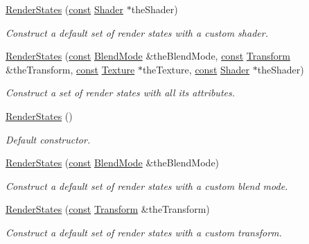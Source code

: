 \begin{DoxyCompactItemize}
\hyperlink{classsf_1_1_render_states_a39f94233f464739d8d8522f3aefe97d0}{Render\-States} (\hyperlink{term__entry_8h_a57bd63ce7f9a353488880e3de6692d5a}{const} \hyperlink{classsf_1_1_shader}{Shader} $\ast$the\-Shader)
\begin{DoxyCompactList}\small\item\em Construct a default set of render states with a custom shader. \end{DoxyCompactList}\item 
\hyperlink{classsf_1_1_render_states_ab5eda13cd8c79c74eba3b1b0df817d67}{Render\-States} (\hyperlink{term__entry_8h_a57bd63ce7f9a353488880e3de6692d5a}{const} \hyperlink{structsf_1_1_blend_mode}{Blend\-Mode} \&the\-Blend\-Mode, \hyperlink{term__entry_8h_a57bd63ce7f9a353488880e3de6692d5a}{const} \hyperlink{classsf_1_1_transform}{Transform} \&the\-Transform, \hyperlink{term__entry_8h_a57bd63ce7f9a353488880e3de6692d5a}{const} \hyperlink{classsf_1_1_texture}{Texture} $\ast$the\-Texture, \hyperlink{term__entry_8h_a57bd63ce7f9a353488880e3de6692d5a}{const} \hyperlink{classsf_1_1_shader}{Shader} $\ast$the\-Shader)
\begin{DoxyCompactList}\small\item\em Construct a set of render states with all its attributes. \end{DoxyCompactList}\item 
\hyperlink{classsf_1_1_render_states_a885bf14070d0d5391f062f62b270b7d0}{Render\-States} ()
\begin{DoxyCompactList}\small\item\em Default constructor. \end{DoxyCompactList}\item 
\hyperlink{classsf_1_1_render_states_acac8830a593c8a4523ac2fdf3cac8a01}{Render\-States} (\hyperlink{term__entry_8h_a57bd63ce7f9a353488880e3de6692d5a}{const} \hyperlink{structsf_1_1_blend_mode}{Blend\-Mode} \&the\-Blend\-Mode)
\begin{DoxyCompactList}\small\item\em Construct a default set of render states with a custom blend mode. \end{DoxyCompactList}\item 
\hyperlink{classsf_1_1_render_states_a3e99cad6ab05971d40357949930ed890}{Render\-States} (\hyperlink{term__entry_8h_a57bd63ce7f9a353488880e3de6692d5a}{const} \hyperlink{classsf_1_1_transform}{Transform} \&the\-Transform)
\begin{DoxyCompactList}\small\item\em Construct a default set of render states with a custom transform. \end{DoxyCompactList}\item 

\end{DoxyCompactItemize}
